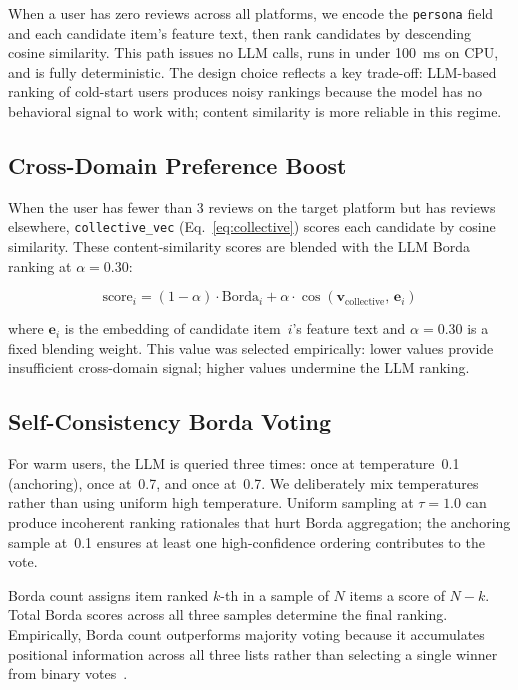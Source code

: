 \documentclass[11pt]{article}
\begin{document}
When a user has zero reviews across all platforms, we encode the
\texttt{persona} field and each candidate item's feature text, then rank
candidates by descending cosine similarity.
This path issues no LLM calls, runs in under 100~ms on CPU, and is
fully deterministic.
The design choice reflects a key trade-off: LLM-based ranking of cold-start
users produces noisy rankings because the model has no behavioral signal to
work with; content similarity is more reliable in this regime.

\subsection{Cross-Domain Preference Boost}

When the user has fewer than 3 reviews on the target platform but has reviews
elsewhere, \texttt{collective\_vec} (Eq.~\ref{eq:collective}) scores each
candidate by cosine similarity.
These content-similarity scores are blended with the LLM Borda ranking at
$\alpha = 0.30$:

\begin{equation}
\text{score}_i = (1 - \alpha) \cdot \text{Borda}_i
               + \alpha \cdot \cos(\mathbf{v}_\text{collective},\,
                                   \mathbf{e}_i)
\label{eq:blend}
\end{equation}

where $\mathbf{e}_i$ is the embedding of candidate item~$i$'s feature text
and $\alpha = 0.30$ is a fixed blending weight.
This value was selected empirically: lower values provide insufficient
cross-domain signal; higher values undermine the LLM ranking.

\subsection{Self-Consistency Borda Voting}

For warm users, the LLM is queried three times: once at temperature~0.1
(anchoring), once at~0.7, and once at~0.7.
We deliberately mix temperatures rather than using uniform high temperature.
Uniform sampling at $\tau = 1.0$ can produce incoherent ranking rationales
that hurt Borda aggregation; the anchoring sample at~0.1 ensures at least one
high-confidence ordering contributes to the vote.

Borda count assigns item ranked $k$-th in a sample of $N$ items a score of
$N - k$.
Total Borda scores across all three samples determine the final ranking.
Empirically, Borda count outperforms majority voting because it accumulates
positional information across all three lists rather than selecting a single
winner from binary votes~\citep{guo2025agentsocietychallenge}.
\end{document}
